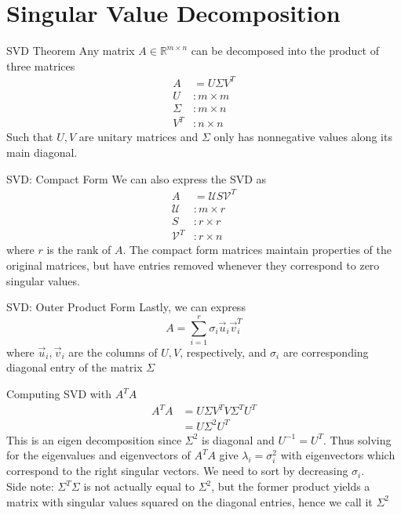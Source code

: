 \documentclass{beamer}
\begin{document}
	\section[SVD]{Singular Value Decomposition}

    \begin{frame}{SVD Theorem}
Any matrix $A \in \mathbb{R}^{m \times n}$ can be decomposed into the product of three matrices
		\begin{align*}
			A &= U \Sigma V^T \\
			U &: m \times m \\
			\Sigma &: m \times n \\
			V^T &: n \times n
		\end{align*}
		Such that $U, V$ are unitary matrices and $\Sigma$ only has nonnegative values along its main diagonal.

    \end{frame}

    \begin{frame}{SVD: Compact Form}
        We can also express the SVD as
		\begin{align*}
			A &= \mathcal{U} S \mathcal{V}^T \\
			\mathcal{U} &: m \times r \\
			S &: r \times r \\
			\mathcal{V}^T &: r \times n
		\end{align*}
		where $r$ is the rank of $A$. The compact form matrices maintain properties of the original matrices, but have entries removed whenever they correspond to zero singular values.

    \end{frame}


    \begin{frame}{SVD: Outer Product Form}
		Lastly, we can express
		\[ A = \sum_{i = 1}^r \sigma_i \vec{u}_i \vec{v}_i^T \]
		where $\vec{u}_i, \vec{v}_i$ are the columns of $U, V$, respectively, and $\sigma_i$ are corresponding diagonal entry of the matrix $\Sigma$
    \end{frame}

    \begin{frame}{Computing SVD with $A^T A$}
		\begin{align*}
			A^T A &= U \Sigma V^T V \Sigma^T U^T \\
			&= U \Sigma^2 U^T
		\end{align*}
		This is an eigen decomposition since $\Sigma^2$ is diagonal and $U^{-1} = U^T$. Thus solving for the eigenvalues and eigenvectors of $A^T A$ give $\lambda_i = \sigma_i^2$ with eigenvectors which correspond to the right singular vectors. We need to sort by decreasing $\sigma_i$. \\

        \alert{Side note:} $\Sigma^T \Sigma$ is not actually equal to $\Sigma^2$, but the former product yields a matrix with singular values squared on the diagonal entries, hence we call it $\Sigma^2$
    \end{frame}
\end{document}
